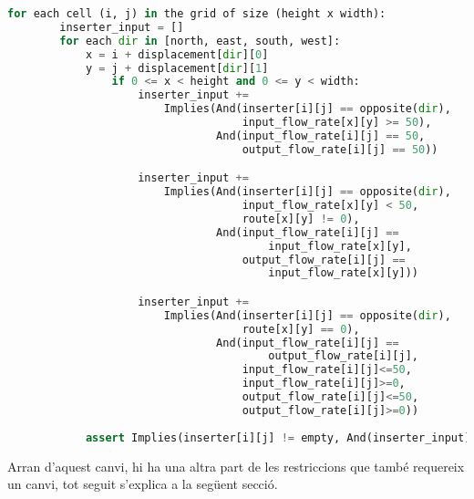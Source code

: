 \begin{lstlisting}[language=Python, caption=Inserter Item Flow Propagation, label=code:inserter_item_flow_propagation]
    for each cell (i, j) in the grid of size (height x width):
        inserter_input = []
        for each dir in [north, east, south, west]:
            x = i + displacement[dir][0]
            y = j + displacement[dir][1]
                if 0 <= x < height and 0 <= y < width:
                    inserter_input += 
                        Implies(And(inserter[i][j] == opposite(dir),
                                    input_flow_rate[x][y] >= 50),
                                And(input_flow_rate[i][j] == 50,
                                    output_flow_rate[i][j] == 50))

                    inserter_input += 
                        Implies(And(inserter[i][j] == opposite(dir),
                                    input_flow_rate[x][y] < 50,
                                    route[x][y] != 0),
                                And(input_flow_rate[i][j] ==
                                        input_flow_rate[x][y],
                                    output_flow_rate[i][j] ==
                                        input_flow_rate[x][y]))

                    inserter_input += 
                        Implies(And(inserter[i][j] == opposite(dir),
                                    route[x][y] == 0),
                                And(input_flow_rate[i][j] ==
                                        output_flow_rate[i][j],
                                    input_flow_rate[i][j]<=50,
                                    input_flow_rate[i][j]>=0,
                                    output_flow_rate[i][j]<=50,
                                    output_flow_rate[i][j]>=0))
    
            assert Implies(inserter[i][j] != empty, And(inserter_input))
    \end{lstlisting}

Arran d'aquest canvi, hi ha una altra part de les restriccions que també requereix un canvi, tot seguit s'explica a la següent secció.

